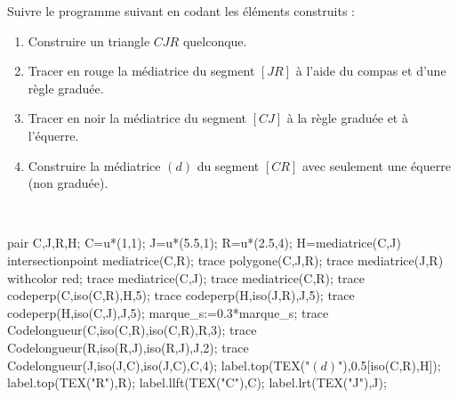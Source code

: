 \begin{exercice*}
   Suivre le programme suivant en codant les éléments construits : \smallskip
   \begin{enumerate}
      \item Construire un triangle $CJR$ quelconque. \smallskip
      \item Tracer en rouge la médiatrice du segment $[JR]$ à l'aide du compas et d'une règle graduée. \smallskip
      \item Tracer en noir la médiatrice du segment $[CJ]$ à la règle graduée et à l'équerre. \smallskip
      \item Construire la médiatrice $(d)$ du segment $[CR]$ avec seulement une équerre (non graduée).
   \end{enumerate}
\end{exercice*}    

\begin{corrige}
   \ \\ [-5mm]
   \begin{Geometrie}[CoinBG={(-0.5u,0)},CoinHD={(6u,4.5u)}]
      pair C,J,R,H;
      C=u*(1,1);
      J=u*(5.5,1);
      R=u*(2.5,4);
      H=mediatrice(C,J) intersectionpoint mediatrice(C,R);
      trace polygone(C,J,R);
      trace mediatrice(J,R) withcolor red;
      trace mediatrice(C,J);
      trace mediatrice(C,R);
      trace codeperp(C,iso(C,R),H,5);
      trace codeperp(H,iso(J,R),J,5);
      trace codeperp(H,iso(C,J),J,5);
      marque_s:=0.3*marque_s;
      trace Codelongueur(C,iso(C,R),iso(C,R),R,3);
      trace Codelongueur(R,iso(R,J),iso(R,J),J,2);
      trace Codelongueur(J,iso(J,C),iso(J,C),C,4);
      label.top(TEX("$(d)$"),0.5[iso(C,R),H]);
      label.top(TEX("R"),R);
      label.llft(TEX("C"),C);
      label.lrt(TEX("J"),J);
   \end{Geometrie}
\end{corrige}    


